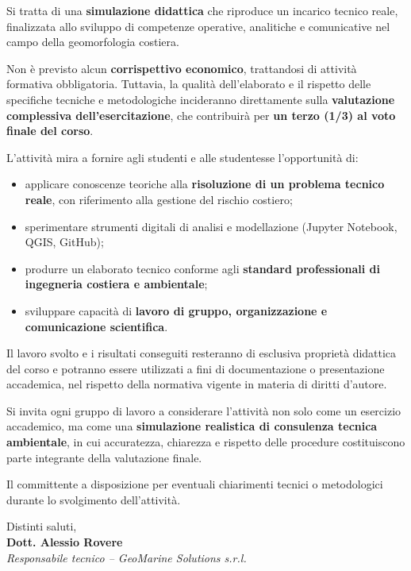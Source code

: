 \documentclass[11pt,a4paper,roman]{moderncv}
\begin{document}
Si tratta di una \textbf{simulazione didattica} che riproduce un incarico tecnico reale, finalizzata allo sviluppo di competenze operative, analitiche e comunicative nel campo della geomorfologia costiera.

Non è previsto alcun \textbf{corrispettivo economico}, trattandosi di attività formativa obbligatoria. Tuttavia, la qualità dell’elaborato e il rispetto delle specifiche tecniche e metodologiche incideranno direttamente sulla \textbf{valutazione complessiva dell’esercitazione}, che contribuirà per \textbf{un terzo (1/3) al voto finale del corso}.

L’attività mira a fornire agli studenti e alle studentesse l’opportunità di:
\begin{itemize}
  \item applicare conoscenze teoriche alla \textbf{risoluzione di un problema tecnico reale}, con riferimento alla gestione del rischio costiero;
  \item sperimentare strumenti digitali di analisi e modellazione (Jupyter Notebook, QGIS, GitHub);
  \item produrre un elaborato tecnico conforme agli \textbf{standard professionali di ingegneria costiera e ambientale};
  \item sviluppare capacità di \textbf{lavoro di gruppo, organizzazione e comunicazione scientifica}.
\end{itemize}

Il lavoro svolto e i risultati conseguiti resteranno di esclusiva proprietà didattica del corso e potranno essere utilizzati a fini di documentazione o presentazione accademica, nel rispetto della normativa vigente in materia di diritti d’autore.

Si invita ogni gruppo di lavoro a considerare l’attività non solo come un esercizio accademico, ma come una \textbf{simulazione realistica di consulenza tecnica ambientale}, in cui accuratezza, chiarezza e rispetto delle procedure costituiscono parte integrante della valutazione finale.  

\vspace{1em}
Il committente a disposizione per eventuali chiarimenti tecnici o metodologici durante lo svolgimento dell’attività.

\vspace{1em}
Distinti saluti, \\[1em]
\textbf{Dott. Alessio Rovere} \\
\textit{Responsabile tecnico – GeoMarine Solutions s.r.l.} \\[5em]
\end{document}
